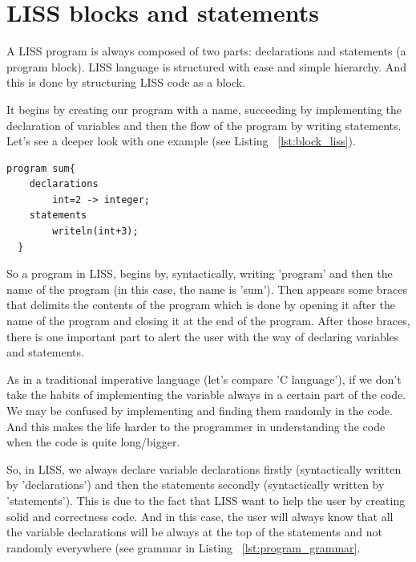 \documentclass[
  oneside,
  11pt, a4paper,
  footinclude=true,
  headinclude=true,
  cleardoublepage=empty
]{scrbook}
\begin{document}
\section{LISS blocks and statements}

A LISS program is always composed of two parts: declarations and statements (a program block).
LISS language is structured with ease and simple hierarchy.
And this is done by structuring LISS code as a block.

It begins by creating our program with a name, succeeding by implementing the declaration of variables and then the flow of the program by writing statements.
Let's see a deeper look with one example (see Listing ~\ref{lst:block_liss}).

\begin{lstlisting}[caption={The structure of a LISS program (example)},label={lst:block_liss}]
  program sum{
    declarations
        int=2 -> integer;
    statements
        writeln(int+3);
  }
\end{lstlisting}

So a program in LISS, begins by, syntactically, writing 'program' and then the name of the program (in this case, the name is 'sum').
Then appears some braces that delimits the contents of the program which is done by opening it after the name of the program and closing it at the end of the program.
After those braces, there is one important part to alert the user with the way of declaring variables and statements.

As in a traditional imperative language (let's compare 'C language'), if we don't take the habits of implementing the variable always in a certain part of the code. We may be confused by implementing and finding them randomly in the code. And this makes the life harder to the programmer in understanding the code when the code is quite long/bigger.

So, in LISS, we always declare variable declarations firstly (syntactically written by 'declarations')  and then the statements secondly (syntactically written by 'statements').
This is due to the fact that LISS want to help the user by creating solid and correctness code. And in this case, the user will always know that all the variable declarations will be always at the top of the statements and not randomly everywhere (see grammar in Listing ~\ref{lst:program_grammar}. 
\end{document}
